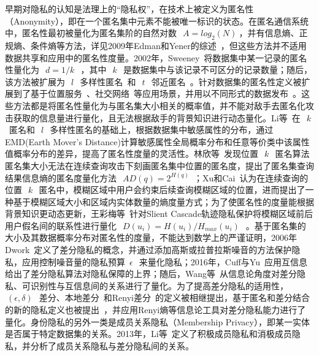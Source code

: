 早期对隐私的认知是法理上的“隐私权”，在技术上被定义为匿名性（Anonymity），即在一个匿名集中元素不能被唯一标识的状态。在匿名通信系统中，匿名性最初被量化为匿名集阶的自然对数~$~A=log_2(N)~$\cite{reiter1998crowds}，并有信息熵、正规熵、条件熵等方法，详见2009年Edman和Yener的综述~\cite{edman2009anonymity}，但这些方法并不适用数据共享和应用中的匿名性度量。2002年，Sweeney~\cite{sweeney2002k}将数据集中某一记录的匿名性量化为~$~d=1/k~$~，其中~$~k~$~是数据集中与该记录不可区分的记录数量；随后，该方法被扩展为~$~l~$~多样性匿名~\cite{machanavajjhala2007l}和~$~t~$~邻近匿名~\cite{li2007t}。针对数据集的匿名性定义被扩展到了基于位置服务~\cite{niu2014achieving}、社交网络~\cite{campan2008data}等应用场景，并用以不同形式的数据发布~\cite{wong2006anonymity,ying2009comparisons}。这些方法都是将匿名性量化为与匿名集大小相关的概率值，并不能对敌手去匿名化攻击获取的信息量进行量化，且无法根据敌手的背景知识进行动态量化。Li等~\cite{li2010closeness}在~$~k~$~匿名和~$~l~$~多样性匿名的基础上，根据数据集中敏感属性的分布，通过EMD(Earth Mover's Distance)计算敏感属性全局概率分布和任意等价类中该属性值概率分布的差异，提高了匿名性度量的灵活性。林欣等~\cite{lin2009lbs}发现位置~$~k~$~匿名算法匿名集大小无法在连续查询攻击下刻画匿名集中位置的匿名度，提出了匿名集查询结果信息熵的匿名度量化方法~$~AD(q)=2^{H(q)}$~；Xu和Cai~\cite{xu2007location}认为在连续查询的位置~$~k~$~匿名中，模糊区域中用户会约束后续查询模糊区域的位置，进而提出了一种基于模糊区域大小和区域内实体数量的熵度量方式；为了使匿名性的度量能根据背景知识更动态更新，王彩梅等~\cite{wang2012location}针对Slient Cascade轨迹隐私保护将模糊区域前后用户假名间的联系性进行量化~$~D(u_i)=H(u_i)/H_{max}(u_i)~$~。基于匿名集的大小及其数据概率分布对匿名性的度量，不能达到数学上的严谨证明，2006年Dwork~\cite{dwork2006differential}定义了差分隐私的概念，并通过添加高斯或拉普拉斯噪音的方法保护隐私，应用控制噪音量的隐私预算~$\epsilon~$~来量化隐私；2016年，Cuff与Yu~\cite{cuff2016differential}应用互信息给出了差分隐私算法对隐私保障的上界；随后，Wang等~\cite{wang2016relation}从信息论角度对差分隐私、可识别性与互信息间的关系进行了量化。为了提高差分隐私的适用性，~$~(\epsilon,\delta)~$~差分、本地差分~\cite{kairouz2014extremal}和Renyi差分~\cite{mironov2017renyi}的定义被相继提出，基于匿名和差分结合的新的隐私定义也被提出~\cite{holohan2017k}，并应用Renyi熵等信息论工具对差分隐私能力进行了量化。身份隐私的另外一类是成员关系隐私（Membership Privacy），即某一实体是否属于特定数据集的关系。2013年，Li等~\cite{li2013membership}定义了积极成员隐私和消极成员隐私，并分析了成员关系隐私与差分隐私间的关系。

